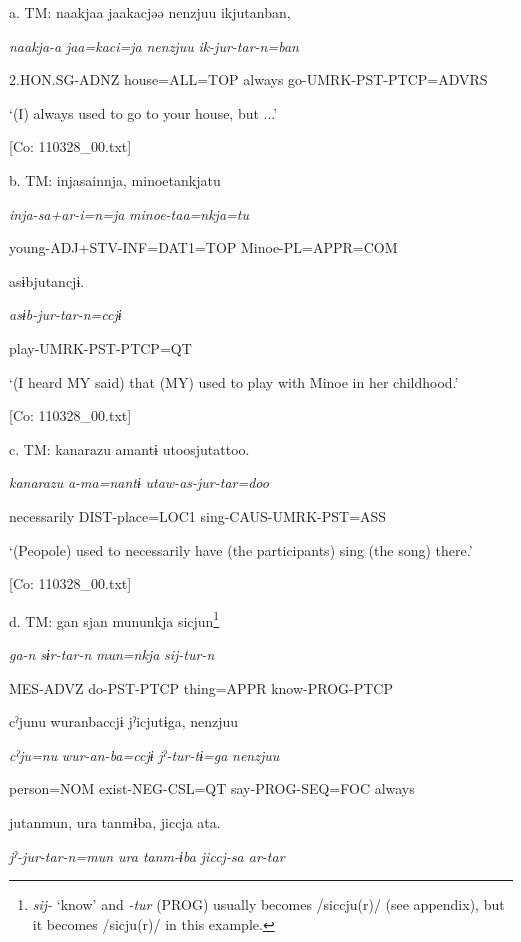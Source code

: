   a.  TM:  naakjaa  jaakacjəə  {\textbar}nenzjuu{\textbar}  ikjutanban,

      \textit{naakja-a}  \textit{jaa=kaci=ja}  \textit{nenzjuu}  \textit{ik-jur-tar{}-n=ban}

      2.HON.SG-ADNZ  house=ALL=TOP  always  go-UMRK-PST-PTCP=ADVRS

      ‘(I) always used to go to your house, but ...’

      [Co: 110328\_00.txt]

  b.  TM:  injasainnja,  minoetankjatu

      \textit{inja-sa+ar-i=n=ja}  \textit{minoe-taa=nkja=tu}

      young-ADJ+STV-INF=DAT1=TOP  Minoe-PL=APPR=COM

      asɨbjutancjɨ.

      \textit{asɨb-jur-tar{}-n=ccjɨ}

      play-UMRK-PST-PTCP=QT

      ‘(I heard MY said) that (MY) used to play with Minoe in her childhood.’

      [Co: 110328\_00.txt]

  c.  TM:  {\textbar}kanarazu{\textbar}  amantɨ  utoosjutattoo.

      \textit{kanarazu}  \textit{a-ma=nantɨ}  \textit{utaw-as-jur-tar=doo}

      necessarily  DIST-place=LOC1  sing-CAUS-UMRK-PST=ASS

      ‘(Peopole) used to necessarily have (the participants) sing (the song) there.’

      [Co: 110328\_00.txt]

  d.  TM:  gan  sjan  mununkja  sicjun\footnote{\textit{sij-} ‘know’ and \textit{{}-tur} (PROG) usually becomes /siccju(r)/ (see appendix), but it becomes /sicju(r)/ in this example.}

      \textit{ga-n}  \textit{sɨr-tar-n}  \textit{mun=nkja}  \textit{sij-tur-n}

      MES-ADVZ  do-PST-PTCP  thing=APPR  know-PROG-PTCP

      cˀjunu  wuranbaccjɨ  jˀicjutɨga,  {\textbar}nenzjuu{\textbar}

      \textit{cˀju=nu}  \textit{wur-an-ba=ccjɨ}  \textit{jˀ-tur-tɨ=ga}  \textit{nenzjuu}

      person=NOM  exist-NEG-CSL=QT  say-PROG-SEQ=FOC  always

      jutanmun,  ura  tanmɨba,  jiccja  ata.

      \textit{jˀ-jur-tar{}-n=mun  ura  tanm-ɨba  jiccj-sa  ar-tar}

